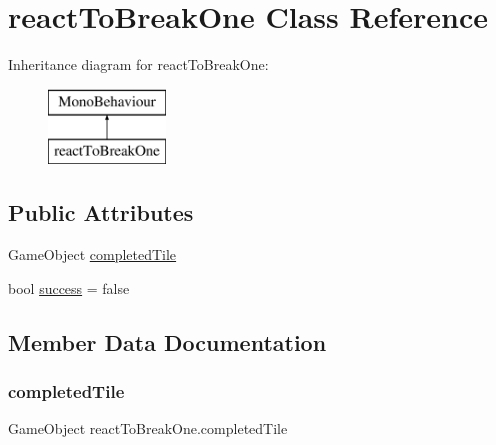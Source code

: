 \hypertarget{classreact_to_break_one}{}\section{react\+To\+Break\+One Class Reference}
\label{classreact_to_break_one}
Inheritance diagram for react\+To\+Break\+One\+:\begin{figure}[H]
\begin{center}
\leavevmode
\includegraphics[height=2.000000cm]{classreact_to_break_one}
\end{center}
\end{figure}
\subsection*{Public Attributes}
\begin{DoxyCompactItemize}
\item 
Game\+Object \hyperlink{classreact_to_break_one_a58ad41382c9a0edee0080fcc4c7918f5}{completed\+Tile}
\item 
bool \hyperlink{classreact_to_break_one_a84619c3ada1dfc8e34daf5bfc83048f6}{success} = false
\end{DoxyCompactItemize}


\subsection{Member Data Documentation}
\mbox{\label{classreact_to_break_one_a58ad41382c9a0edee0080fcc4c7918f5}} 
\subsubsection{\texorpdfstring{completed\+Tile}{completedTile}}
{\footnotesize\ttfamily Game\+Object react\+To\+Break\+One.\+completed\+Tile}

\mbox{\label{classreact_to_break_one_a84619c3ada1dfc8e34daf5bfc83048f6}} 
